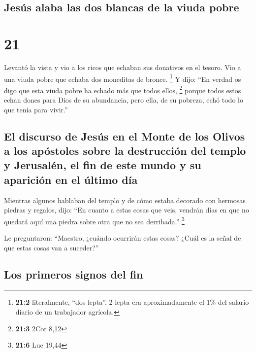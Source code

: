 \hypertarget{jesuxfas-alaba-las-dos-blancas-de-la-viuda-pobre}{%
\subsection{Jesús alaba las dos blancas de la viuda
pobre}\label{jesuxfas-alaba-las-dos-blancas-de-la-viuda-pobre}}

\hypertarget{section-20}{%
\section{21}\label{section-20}}

 Levantó la vista y vio a los ricos que echaban sus
donativos en el tesoro.  Vio a una viuda pobre que echaba
dos moneditas de bronce. \footnote{\textbf{21:2} literalmente, ``dos
  lepta''. 2 lepta era aproximadamente el 1\% del salario diario de un
  trabajador agrícola.}  Y dijo: ``En verdad os digo que
esta viuda pobre ha echado más que todos ellos, \footnote{\textbf{21:3}
  2Cor 8,12}  porque todos estos echan dones para Dios de
su abundancia, pero ella, de su pobreza, echó todo lo que tenía para
vivir.''

\hypertarget{el-discurso-de-jesuxfas-en-el-monte-de-los-olivos-a-los-apuxf3stoles-sobre-la-destrucciuxf3n-del-templo-y-jerusaluxe9n-el-fin-de-este-mundo-y-su-apariciuxf3n-en-el-uxfaltimo-duxeda}{%
\subsection{El discurso de Jesús en el Monte de los Olivos a los
apóstoles sobre la destrucción del templo y Jerusalén, el fin de este
mundo y su aparición en el último
día}\label{el-discurso-de-jesuxfas-en-el-monte-de-los-olivos-a-los-apuxf3stoles-sobre-la-destrucciuxf3n-del-templo-y-jerusaluxe9n-el-fin-de-este-mundo-y-su-apariciuxf3n-en-el-uxfaltimo-duxeda}}

 Mientras algunos hablaban del templo y de cómo estaba
decorado con hermosas piedras y regalos, dijo:  ``En
cuanto a estas cosas que veis, vendrán días en que no quedará aquí una
piedra sobre otra que no sea derribada.'' \footnote{\textbf{21:6} Luc
  19,44}

 Le preguntaron: ``Maestro, ¿cuándo ocurrirán estas cosas?
¿Cuál es la señal de que estas cosas van a suceder?''

\hypertarget{los-primeros-signos-del-fin}{%
\subsection{Los primeros signos del
fin}\label{los-primeros-signos-del-fin}}

